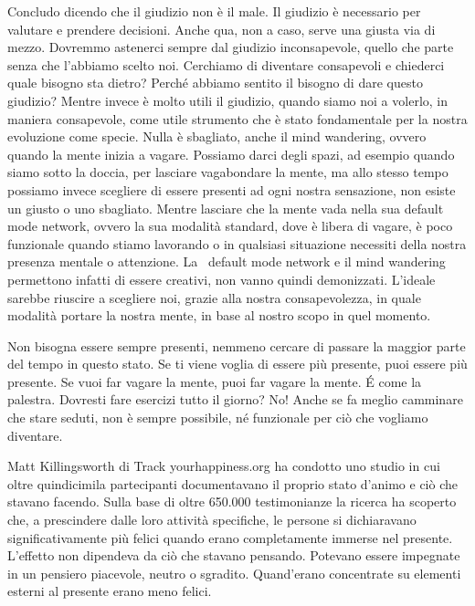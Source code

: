 \documentclass[12pt]{book} %
\begin{document}
Concludo dicendo che il giudizio non è il male. Il giudizio è necessario per valutare e prendere decisioni. Anche qua,
non a caso, serve una giusta via di mezzo. Dovremmo astenerci sempre dal giudizio inconsapevole, quello che parte senza
che l'abbiamo scelto noi. Cerchiamo di diventare consapevoli e chiederci quale bisogno sta dietro?
Perché abbiamo sentito il bisogno di dare questo giudizio? Mentre invece è molto utili il giudizio, quando siamo noi a
volerlo, in maniera consapevole, come utile strumento che è stato fondamentale per la nostra evoluzione come specie.
Nulla è sbagliato, anche il mind wandering, ovvero quando la mente inizia a vagare. Possiamo darci degli spazi, ad
esempio quando siamo sotto la doccia, per lasciare vagabondare la mente, ma allo stesso tempo possiamo invece scegliere
di essere presenti ad ogni nostra sensazione, non esiste un giusto o uno sbagliato. Mentre lasciare che la mente vada
nella sua default mode network, ovvero la sua modalità standard, dove è libera di vagare, è poco funzionale quando
stiamo lavorando o in qualsiasi situazione necessiti della nostra presenza mentale o attenzione. La \ default mode
network e il mind wandering permettono infatti di essere creativi, non vanno quindi
demonizzati.
L'ideale sarebbe riuscire a scegliere noi, grazie alla nostra consapevolezza, in quale modalità
portare la nostra mente, in base al nostro scopo in quel momento.

Non bisogna essere sempre presenti, nemmeno cercare di passare la maggior parte del tempo in questo stato. Se ti viene
voglia di essere più presente, puoi essere più presente. Se vuoi far vagare la mente, puoi far vagare la mente. É come
la palestra. Dovresti fare esercizi tutto il giorno? No! Anche se fa meglio camminare che stare seduti, non è sempre
possibile, né funzionale per ciò che vogliamo diventare.

Matt Killingsworth di Track yourhappiness.org ha condotto uno studio in cui oltre quindicimila partecipanti
documentavano il proprio stato d'animo e ciò che stavano facendo. Sulla base di oltre 650.000
testimonianze la ricerca ha scoperto che, a prescindere dalle loro attività specifiche, le persone si dichiaravano
significativamente più felici quando erano completamente immerse nel presente. L'effetto non
dipendeva da ciò che stavano pensando. Potevano essere impegnate in un pensiero piacevole, neutro o sgradito.
Quand'erano concentrate su elementi esterni al presente erano meno felici. 
\end{document}
